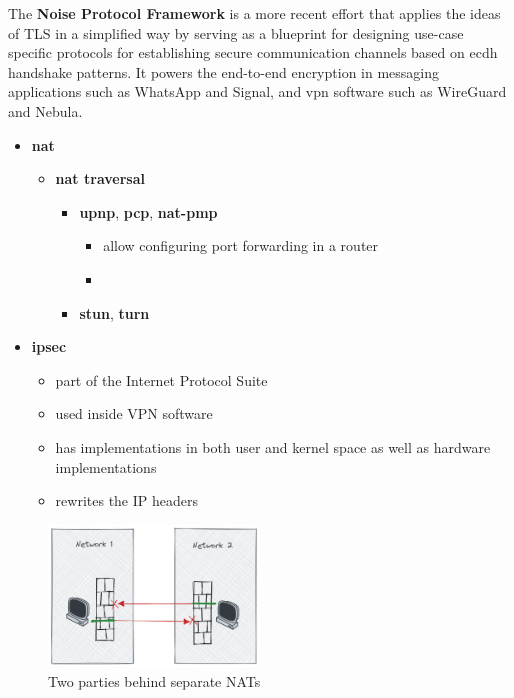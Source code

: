 The \textbf{Noise Protocol Framework} \autocite{noiseDocs} is a more
recent effort that applies the ideas of TLS in a simplified way by
serving as a blueprint for designing use-case specific protocols for
establishing secure communication channels based on \gls{ecdh} handshake
patterns. It powers the end-to-end encryption in messaging applications
such as WhatsApp and Signal, and \gls{vpn} software such as WireGuard
and Nebula.  

\begin{itemize}
\tightlist
\item
  \textbf{\acrfull{nat}}

  \begin{itemize}
  \tightlist
  \item
    \textbf{\gls{nat} traversal}

    \begin{itemize}
    \tightlist
    \item
      \textbf{\acrfull{upnp}}, \textbf{\acrfull{pcp}},
      \textbf{\acrfull{nat-pmp}}

      \begin{itemize}
      \tightlist
      \item
        allow configuring port forwarding in a router
      \item
      \end{itemize}
    \item
      \textbf{\acrfull{stun}}, \textbf{\acrfull{turn}}
    \end{itemize}
  \end{itemize}
\item
  \textbf{\acrfull{ipsec}}

  \begin{itemize}
  \tightlist
  \item
    part of the Internet Protocol Suite
  \item
    used inside VPN software
  \item
    has implementations in both user and kernel space as well as
    hardware implementations
  \item
    rewrites the IP headers
  \end{itemize}
\end{itemize}

\begin{figure}
\centering
\includegraphics[width=0.5\textwidth,height=0.25\textheight]{thesis/../figures/nat-intro.png}
\caption{Two parties behind separate NATs\label{nat-intro}}
\end{figure}

